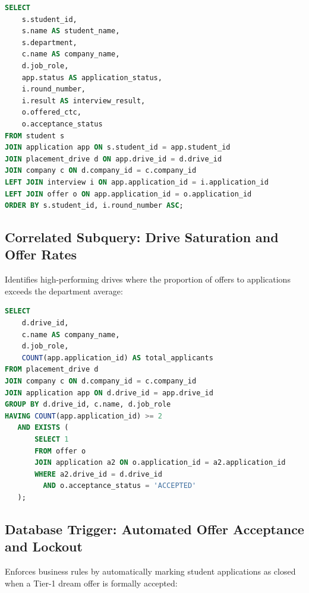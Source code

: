 \documentclass[11pt,a4paper]{article}
\begin{document}
\begin{lstlisting}[language=SQL, caption={Full Candidate Placement Lifecycle Audit}]
SELECT 
    s.student_id,
    s.name AS student_name,
    s.department,
    c.name AS company_name,
    d.job_role,
    app.status AS application_status,
    i.round_number,
    i.result AS interview_result,
    o.offered_ctc,
    o.acceptance_status
FROM student s
JOIN application app ON s.student_id = app.student_id
JOIN placement_drive d ON app.drive_id = d.drive_id
JOIN company c ON d.company_id = c.company_id
LEFT JOIN interview i ON app.application_id = i.application_id
LEFT JOIN offer o ON app.application_id = o.application_id
ORDER BY s.student_id, i.round_number ASC;
\end{lstlisting}

\subsection{Correlated Subquery: Drive Saturation and Offer Rates}
Identifies high-performing drives where the proportion of offers to applications exceeds the department average:

\begin{lstlisting}[language=SQL, caption={Correlated Subquery for High-Conversion Drives}]
SELECT 
    d.drive_id,
    c.name AS company_name,
    d.job_role,
    COUNT(app.application_id) AS total_applicants
FROM placement_drive d
JOIN company c ON d.company_id = c.company_id
JOIN application app ON d.drive_id = app.drive_id
GROUP BY d.drive_id, c.name, d.job_role
HAVING COUNT(app.application_id) >= 2
   AND EXISTS (
       SELECT 1 
       FROM offer o 
       JOIN application a2 ON o.application_id = a2.application_id
       WHERE a2.drive_id = d.drive_id 
         AND o.acceptance_status = 'ACCEPTED'
   );
\end{lstlisting}

\subsection{Database Trigger: Automated Offer Acceptance and Lockout}
Enforces business rules by automatically marking student applications as closed when a Tier-1 dream offer is formally accepted:
\end{document}

